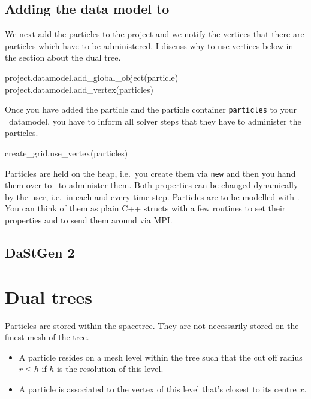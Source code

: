 \subsection{Adding the data model to \Peano}

We next add the particles to the project and we notify the vertices that there 
are particles which have to be administered. 
I discuss why to use vertices below in the section about the dual tree.

\begin{code}
project.datamodel.add_global_object(particle)
project.datamodel.add_vertex(particles)
\end{code}

\noindent
Once you have added the particle and the particle container \texttt{particles}
to your \Peano\ datamodel, you have to inform all solver steps that they have to
administer the particles.

\begin{code}
create_grid.use_vertex(particles)
\end{code}


\noindent
Particles are held on the heap, i.e.~you create them via \texttt{new} and then
you hand them over to \Peano\ to administer them.
Both properties can be changed dynamically by the user, i.e.~in each and every
time step.
Particles are to be modelled with \DaStGen.
You can think of them as plain C++ structs with a few routines to set their
properties and to send them around via MPI.



\subsection{DaStGen 2}




\section{Dual trees}

Particles are stored within the spacetree.
They are not necessarily stored on the finest mesh of the tree.

\begin{itemize}
  \item A particle resides on a mesh level within the tree such that the
  cut off radius $r \leq h$ if $h$ is the resolution of this level.
  \item A particle is associated to the vertex of this level that's closest to
  its centre $x$.
\end{itemize}

